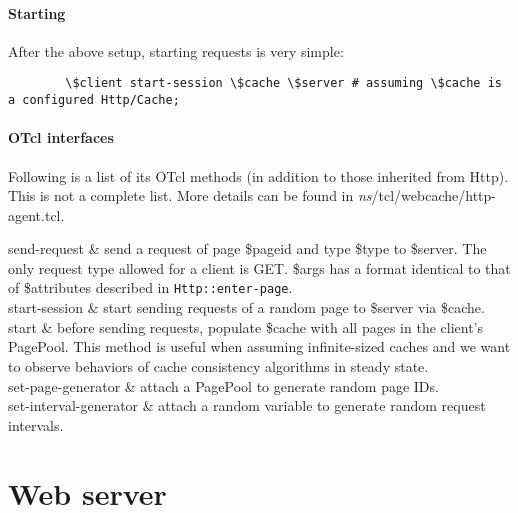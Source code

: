 \paragraph{Starting}

After the above setup, starting requests is very simple:

\begin{verbatim}
        \$client start-session \$cache \$server # assuming \$cache is a configured Http/Cache;
\end{verbatim}

\paragraph{OTcl interfaces}
Following is a list of its OTcl methods (in addition to those
inherited from Http). This is not a complete list. More details can be
found in \emph{ns}/tcl/webcache/http-agent.tcl.

\begin{\par\tabular{\textwidth}{rX}}
send-request     & 
send a request of page \$pageid and type \$type to \$server. The only 
request type allowed for a client is GET. \$args has a format identical
to that of \$attributes described in {\tt Http::enter-page}. \\

start-session   & start sending requests of a 
random page to \$server via \$cache. \\

start   & before sending requests, populate
\$cache with all pages in the client's PagePool. This method is useful 
when assuming infinite-sized caches and we want to observe behaviors 
of cache consistency algorithms in steady state. \\

set-page-generator  & attach a PagePool to generate 
random page IDs.\\

set-interval-generator  & attach a random variable to generate
random request intervals.\\
\end{\par\tabular{\textwidth}{rX}}


\section{Web server}
\label{seccom:webcache-server}

